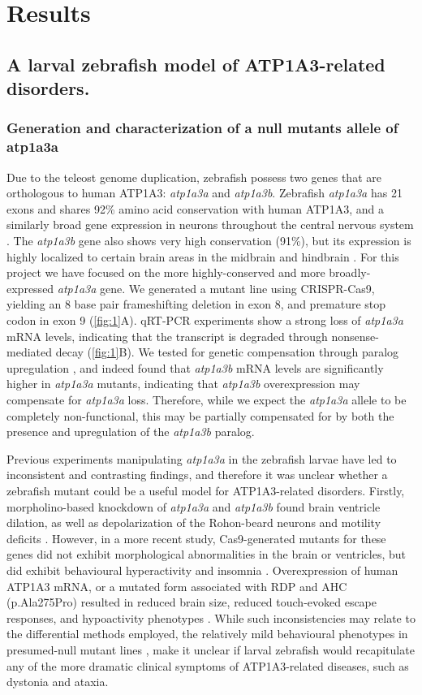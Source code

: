 \documentclass[9.5pt,lineno]{RandlettLab_elife}
\begin{document}
\section{Results}
\subsection{A larval zebrafish model of ATP1A3-related disorders.}
\subsubsection{Generation and characterization of a null mutants allele of atp1a3a}

Due to the teleost genome duplication, zebrafish possess two genes that are orthologous to human ATP1A3: \emph{atp1a3a} and \emph{atp1a3b}. Zebrafish \emph{atp1a3a} has 21 exons and shares 92\% amino acid conservation with human ATP1A3, and a similarly broad gene expression in neurons throughout the central nervous system \citep{Doanl2013}. 
The \emph{atp1a3b} gene also shows very high conservation (91\%), but its expression is highly localized to certain brain areas in the midbrain and hindbrain \citep{Doanl2013}. 
For this project we have focused on the more highly-conserved and more broadly-expressed \emph{atp1a3a} gene. 
We generated a mutant line using CRISPR-Cas9, yielding an 8 base pair frameshifting deletion in exon 8, and premature stop codon in exon 9 (\autoref{fig:1}A). 
qRT-PCR experiments show a strong loss of \emph{atp1a3a} mRNA levels, indicating that the transcript is degraded through nonsense-mediated decay (\autoref{fig:1}B).
We tested for genetic compensation through paralog upregulation \citep{Rossi2015}, and indeed found that \emph{atp1a3b} mRNA levels are significantly higher in \emph{atp1a3a} mutants, indicating that \emph{atp1a3b} overexpression may compensate for \emph{atp1a3a} loss. 
Therefore, while we expect the \emph{atp1a3a} allele to be completely non-functional, this may be partially compensated for by both the presence and upregulation of the \emph{atp1a3b} paralog.

Previous experiments manipulating \emph{atp1a3a} in the zebrafish larvae have led to inconsistent and contrasting findings, and therefore it was unclear whether a zebrafish mutant could be a useful model for ATP1A3-related disorders. 
Firstly, morpholino-based knockdown of \emph{atp1a3a} and \emph{atp1a3b} found brain ventricle dilation, as well as depolarization of the Rohon-beard neurons and motility deficits \citep{Doanl2013}.
However, in a more recent study, Cas9-generated mutants for these genes did not exhibit  morphological abnormalities in the brain or ventricles, but did exhibit behavioural hyperactivity and insomnia \citep{Barlow2023}.
Overexpression of human ATP1A3 mRNA, or a mutated form associated with RDP and AHC (p.Ala275Pro) resulted in reduced brain size, reduced touch-evoked escape responses, and hypoactivity phenotypes \citep{Ruan2024}.
While such inconsistencies may relate to the differential methods employed, the relatively mild behavioural phenotypes in presumed-null mutant lines \citep{Barlow2023}, make it unclear if larval zebrafish would recapitulate any of the more dramatic clinical symptoms of ATP1A3-related diseases, such as dystonia and ataxia.
\end{document}

